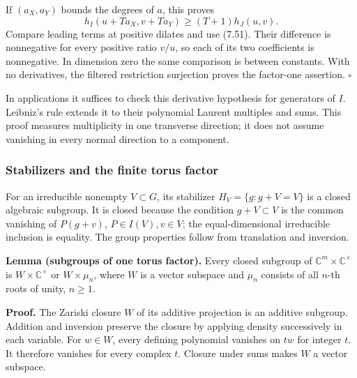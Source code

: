 \documentclass[
  11pt,
  a4paper,
]{article}
\newcounter{none} %
\begin{document}
If \((a_X,a_Y)\) bounds the degrees of \(a\), this proves \[
h_I(u+Ta_X,v+Ta_Y)\ge(T+1)h_J(u,v).
\] Compare leading terms at positive dilates and use (7.51). Their
difference is nonnegative for every positive ratio \(v/u\), so each of
its two coefficients is nonnegative. In dimension zero the same
comparison is between constants. With no derivatives, the filtered
restriction surjection proves the factor-one assertion. \(\square\)

In applications it suffices to check this derivative hypothesis for
generators of \(I\). Leibniz's rule extends it to their polynomial
Laurent multiples and sums. This proof measures multiplicity in one
transverse direction; it does not assume vanishing in every normal
direction to a component.

\subsubsection{Stabilizers and the finite torus
factor}\label{stabilizers-and-the-finite-torus-factor}

For an irreducible nonempty \(V\subset G\), its stabilizer
\(H_V=\{g:g+V=V\}\) is a closed algebraic subgroup. It is closed because
the condition \(g+V\subset V\) is the common vanishing of \(P(g+v)\),
\(P\in I(V),v\in V\); the equal-dimensional irreducible inclusion is
equality. The group properties follow from translation and inversion.

\textbf{Lemma (subgroups of one torus factor).} Every closed subgroup of
\(\mathbb C^m\times\mathbb C^\times\) is \(W\times\mathbb C^\times\) or
\(W\times\mu_n\), where \(W\) is a vector subspace and \(\mu_n\)
consists of all \(n\)-th roots of unity, \(n\ge1\).

\textbf{Proof.} The Zariski closure \(W\) of its additive projection is
an additive subgroup. Addition and inversion preserve the closure by
applying density successively in each variable. For \(w\in W\), every
defining polynomial vanishes on \(tw\) for integer \(t\). It therefore
vanishes for every complex \(t\). Closure under sums makes \(W\) a
vector subspace.
\end{document}
